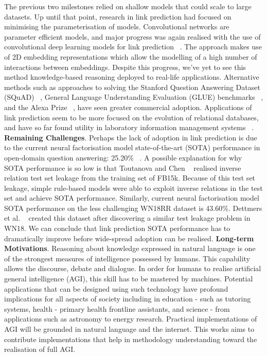 The previous two milestones relied on shallow models that could scale to large datasets. Up until that point, research in link prediction had focused on minimising the parameterisation of models. Convolutional networks are parameter efficient models, and major progress was again realised with the use of convolutional deep learning models for link prediction ~\citep{dettmers2018convolutional}. The approach makes use of 2D embedding representations which allow the modelling of a high number of interactions between embeddings. \newline 
Despite this progress, we've yet to see this method knowledge-based reasoning deployed to real-life applications. Alternative methods such as approaches to solving the Stanford Question Answering Dataset (SQuAD) ~\citep{rajpurkar2016squad}, General Language Understanding Evaluation (GLUE) benchmarks ~\citep{liu2019roberta}, and the Alexa Prize ~\citep{ram2018conversational}, have seen greater commercial adoption. Applications of link prediction seem to be more focused on the evolution of relational databases, and have so far found utility in laboratory information management systems ~\citep{HARROW20192068}. \newline
\textbf{Remaining Challenges}. Perhaps the lack of adoption in link prediction is due to the current neural factorisation model state-of-the-art (SOTA) performance in open-domain question answering: 25.20\% ~\citep{balazevic2019hypernetwork}. A possible explanation for why SOTA performance is so low is that Toutanova and Chen ~\citep{toutanova2015observed} realised inverse relation test set leakage from the training set of FB15k. Because of this test set leakage, simple rule-based models were able to exploit inverse relations in the test set and achieve SOTA performance. Similarly, current neural factorisation model SOTA performance on the less challenging WN18RR dataset is 43.60\%. Dettmers et al. ~\citep{dettmers2018convolutional} created this dataset after discovering a similar test leakage problem in WN18. We can conclude that link prediction SOTA performance has to dramatically improve before wide-spread adoption can be realised. \newline
\textbf{Long-term Motivations}. Reasoning about knowledge expressed in natural language is one of the strongest measures of intelligence possessed by humans. This capability allows the discourse, debate and dialogue. In order for humans to realise artificial general intelligence (AGI), this skill has to be mastered by machines. Potential applications that can be designed using such technology have profound implications for all aspects of society including in education - such as tutoring systems, health - primary health frontline assistants, and science - from applications such as astronomy to energy research. Practical implementations of AGI will be grounded in natural language and the internet. This works aims to contribute implementations that help in methodology understanding toward the realisation of full AGI.  \newline
